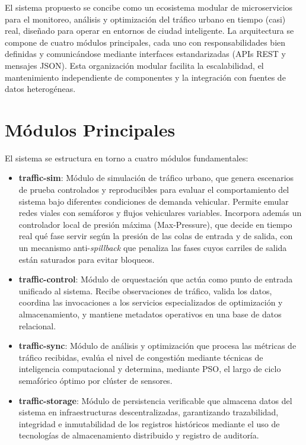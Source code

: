 El sistema propuesto se concibe como un ecosistema modular de microservicios para el monitoreo, análisis y optimización del tráfico urbano en tiempo (casi) real, diseñado para operar en entornos de ciudad inteligente. La arquitectura se compone de cuatro módulos principales, cada uno con responsabilidades bien definidas y comunicándose mediante interfaces estandarizadas (APIs REST y mensajes JSON). Esta organización modular facilita la escalabilidad, el mantenimiento independiente de componentes y la integración con fuentes de datos heterogéneas.

\section{Módulos Principales}

El sistema se estructura en torno a cuatro módulos fundamentales:

\begin{itemize}
    \item \textbf{traffic-sim}: Módulo de simulación de tráfico urbano, que genera escenarios de prueba controlados y reproducibles para evaluar el comportamiento del sistema bajo diferentes condiciones de demanda vehicular. Permite emular redes viales con semáforos y flujos vehiculares variables. Incorpora además un controlador local de presión máxima (Max-Pressure), que decide en tiempo real qué fase servir según la presión de las colas de entrada y de salida, con un mecanismo anti-\emph{spillback} que penaliza las fases cuyos carriles de salida están saturados para evitar bloqueos.
    
    \item \textbf{traffic-control}: Módulo de orquestación que actúa como punto de entrada unificado al sistema. Recibe observaciones de tráfico, valida los datos, coordina las invocaciones a los servicios especializados de optimización y almacenamiento, y mantiene metadatos operativos en una base de datos relacional.
    
    \item \textbf{traffic-sync}: Módulo de análisis y optimización que procesa las métricas de tráfico recibidas, evalúa el nivel de congestión mediante técnicas de inteligencia computacional y determina, mediante PSO, el largo de ciclo semafórico óptimo por clúster de sensores.
    
    \item \textbf{traffic-storage}: Módulo de persistencia verificable que almacena datos del sistema en infraestructuras descentralizadas, garantizando trazabilidad, integridad e inmutabilidad de los registros históricos mediante el uso de tecnologías de almacenamiento distribuido y registro de auditoría.
\end{itemize}


